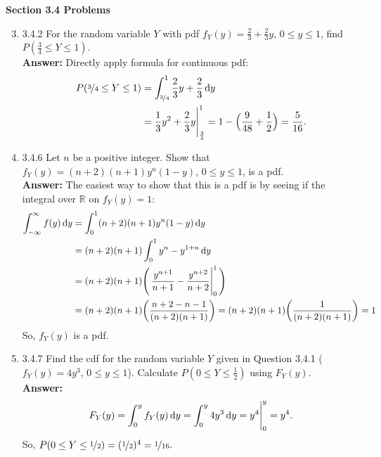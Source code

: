 \documentclass{article}
\begin{document}
    \textbf{Section 3.4 Problems}
    \begin{enumerate}\setcounter{enumi}{2}
        \item 3.4.2 For the random variable $Y$ with pdf $f_Y(y) = \frac{2}{3}+\frac{2}{3}y$, $0\leq y \leq 1$, find $P(\frac{3}{4} \leq Y \leq 1)$.\\
        \textbf{Answer: }Directly apply formula for continuous pdf:
            \begin{align*}
                P(\nicefrac{3}{4} \leq Y \leq 1) &= \int_{\nicefrac{3}{4}}^1 \frac{2}{3}y+\frac{2}{3}\dif y\\
                &= \eval{\frac{1}{3}y^2+\frac{2}{3}y}_\frac{3}{4}^1 = 1-\Big(\frac{9}{48}+\frac{1}{2}\Big) = \frac{5}{16}.
            \end{align*}
        
        \item 3.4.6 Let $n$ be a positive integer. Show that $f_Y(y) = (n+2)(n+1)y^n(1-y)$, $0 \leq y \leq 1$, is a pdf.\\
        \textbf{Answer: }The easiest way to show that this is a pdf is by seeing if the integral over $\mathbb{R}$ on $f_Y(y) = 1$:
            \begin{align*}
                \int_{-\infty}^\infty f(y) \dif y &= \int_0^1 (n+2)(n+1)y^n(1-y)\dif y\\
                &= (n+2)(n+1)\int_0^1 y^n-y^{1+n}\dif y\\
                &= (n+2)(n+1)\Bigg(\eval{\frac{y^{n+1}}{n+1}-\frac{y^{n+2}}{n+2}}_0^1\Bigg)\\
                &= (n+2)(n+1)\bigg(\frac{n+2-n-1}{(n+2)(n+1)}\bigg) = (n+2)(n+1)\bigg(\frac{1}{(n+2)(n+1)}\bigg) = 1
            \end{align*}
        So, $f_Y(y)$ is a pdf.\\
        
        \item 3.4.7 Find the cdf for the random variable $Y$ given in Question 3.4.1 ($f_Y(y) = 4y^3$, $0 \leq y \leq 1$). Calculate $P(0 \leq Y \leq \frac{1}{2})$ using $F_Y(y)$.\\
        \textbf{Answer: }
            \begin{align*}
                F_Y(y) = \int_0^y f_Y(y) \dif y = \int_0^y 4y^3 \dif y = \eval{y^4}_0^y = y^4.
            \end{align*}
        So, $P(0 \leq Y \leq \nicefrac{1}{2}) = (\nicefrac{1}{2})^4 = \nicefrac{1}{16}$.\\
        

\end{enumerate}
\end{document}
